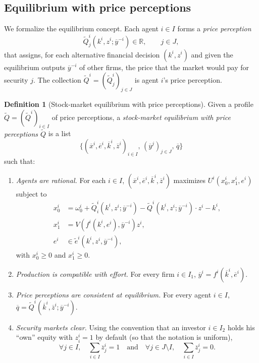 \documentclass[11pt,a4paper,oneside]{book}
\def\R{\mathbb{R}}
\def\geq{\geqslant}
\def\et{\quad \text{and} \quad}
\theoremstyle{plain}
\theoremstyle{definition}
\newtheorem{definition}[theorem]{Definition}
\theoremstyle{remark}
\numberwithin{equation}{chapter}
\begin{document}
\subsection{Equilibrium with price perceptions}

We formalize the equilibrium concept.
Each agent $i \in I$ forms a \emph{price perception}
\begin{equation*}
  \widetilde{Q}^i_j(k^i, z^i; \overline{y}^{-i}) \in \R,
  \qquad j \in J,
\end{equation*}
that assigns, for each alternative financial decision $(k^i, z^i)$ and given the equilibrium outputs $\overline{y}^{-i}$ of other firms, the price that the market would pay for security $j$.
The collection $\widetilde{Q}^i = (\widetilde{Q}^i_j)_{j \in J}$ is agent $i$'s price perception.

\begin{definition}[Stock-market equilibrium with price perceptions]\label{def:eq-PP}
Given a profile $\widetilde{Q} = (\widetilde{Q}^i)_{i \in I}$ of price perceptions, a \emph{stock-market equilibrium with price perceptions $\widetilde{Q}$} is a list
\begin{equation*}
  \bigl\{ (\overline{x}^i, \overline{e}^i, \overline{k}^i, \overline{z}^i)_{i \in I}, \, (\overline{y}^j)_{j \in J}, \, \overline{q} \bigr\}
\end{equation*}
such that:
\begin{enumerate}
  \item[(a)] \emph{Agents are rational.}
  For each $i \in I$, $(\overline{x}^i, \overline{e}^i, \overline{k}^i, \overline{z}^i)$ maximizes $U^i(x^i_0, x^i_1, e^i)$ subject to
  \begin{align*}
    x^i_0 &= \omega^i_0 + \widetilde{Q}^i_i(k^i, z^i; \overline{y}^{-i}) - \widetilde{Q}^i(k^i, z^i; \overline{y}^{-i}) \cdot z^i - k^i, \\
    x^i_1 &= V(f^i(k^i, e^i), \overline{y}^{-i}) z^i, \\
    e^i &\in \widetilde{e}^i(k^i, z^i, \overline{y}^{-i}),
  \end{align*}
  with $x^i_0 \geq 0$ and $x^i_1 \geq 0$.
  \item[(b)] \emph{Production is compatible with effort.}
  For every firm $i \in I_1$, $\overline{y}^i = f^i(\overline{k}^i, \overline{e}^i)$.
  \item[(c)] \emph{Price perceptions are consistent at equilibrium.}
  For every agent $i \in I$, $\overline{q} = \widetilde{Q}^i(\overline{k}^i, \overline{z}^i; \overline{y}^{-i})$.
  \item[(d)] \emph{Security markets clear.}
  Using the convention that an investor $i \in I_2$ holds his ``own'' equity with $z^i_i = 1$ by default (so that the notation is uniform),
  \begin{equation*}
    \forall j \in I, \quad \sum_{i \in I} \overline{z}^i_j = 1
    \et
    \forall j \in J \setminus I, \quad \sum_{i \in I} \overline{z}^i_j = 0.
  \end{equation*}
\end{enumerate}
\end{definition}
\end{document}
